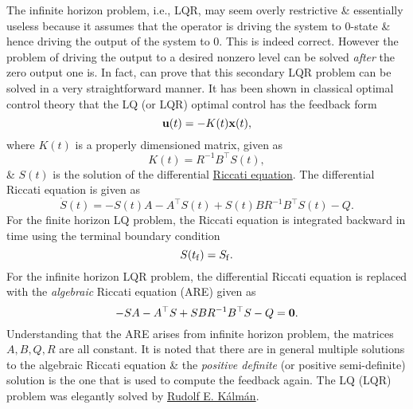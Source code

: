 \documentclass{article}
\begin{document}
The infinite horizon problem, i.e., LQR, may seem overly restrictive \& essentially useless because it assumes that the operator is driving the system to 0-state \& hence driving the output of the system to 0. This is indeed correct. However the problem of driving the output to a desired nonzero level can be solved {\it after} the zero output one is. In fact, can prove that this secondary LQR problem can be solved in a very straightforward manner. It has been shown in classical optimal control theory that the LQ (or LQR) optimal control has the feedback form
\begin{equation}
	{\bf u}(t) = -K(t){\bf x}(t),
\end{equation}
where $K(t)$ is a properly dimensioned matrix, given as
\begin{equation}
	K(t) = R^{-1}B^\top S(t),
\end{equation}
\& $S(t)$ is the solution of the differential \href{https://en.wikipedia.org/wiki/Riccati_equation}{Riccati equation}. The differential Riccati equation is given as
\begin{equation}
	\dot S(t) = -S(t)A - A^\top S(t) + S(t)BR^{-1}B^\top S(t) - Q.
\end{equation}
For the finite horizon LQ problem, the Riccati equation is integrated backward in time using the terminal boundary condition
\begin{equation}
	S(t_{\rm f}) = S_{\rm f}.
\end{equation}
For the infinite horizon LQR problem, the differential Riccati equation is replaced with the {\it algebraic} Riccati equation (ARE) given as
\begin{equation}
	-SA - A^\top S + SBR^{-1}B^\top S - Q = {\bf 0}.
\end{equation}
Understanding that the ARE arises from infinite horizon problem, the matrices $A,B,Q,R$ are all constant. It is noted that there are in general multiple solutions to the algebraic Riccati equation \& the {\it positive definite} (or positive semi-definite) solution is the one that is used to compute the feedback again. The LQ (LQR) problem was elegantly solved by \href{https://en.wikipedia.org/wiki/Rudolf_E._K%C3%A1lm%C3%A1n}{Rudolf E. K\'alm\'an}.
\end{document}
